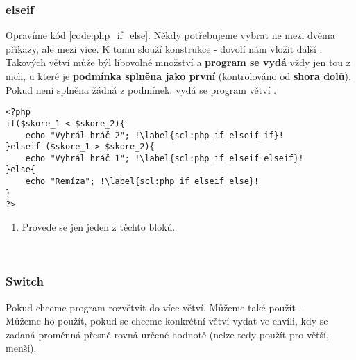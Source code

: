 \subsubsection{elseif}
Opravíme kód \ref{code:php_if_else}. Někdy potřebujeme vybrat ne mezi dvěma příkazy, ale mezi více. K tomu slouží konstrukce  - dovolí nám vložit další . Takových větví může býl libovolné množství a \textbf{program se vydá} vždy jen tou z nich, u které je \textbf{podmínka splněna jako první} (kontrolováno od \textbf{shora dolů}). Pokud není splněna žádná z podmínek, vydá se program větví .
\begin{minipage}[t]{.45\textwidth}
\begin{code}
\begin{verbatim}
<?php
if($skore_1 < $skore_2){
	echo "Vyhrál hráč 2"; !\label{scl:php_if_elseif_if}!
}elseif ($skore_1 > $skore_2){
	echo "Vyhrál hráč 1"; !\label{scl:php_if_elseif_elseif}!
}else{
	echo "Remíza"; !\label{scl:php_if_elseif_else}!
}
?>
\end{verbatim}

\label{code:php_if_else}
\end{code}
\end{minipage}
\begin{minipage}[t]{.45\textwidth}
\begin{enumerate}
\item[ř. \ref{scl:php_if_elseif_if}, \ref{scl:php_if_elseif_elseif}, \ref{scl:php_if_elseif_else}:] Provede se jen jeden z těchto bloků.
\end{enumerate}
\end{minipage}\\

\subsubsection{Switch}
Pokud chceme program rozvětvit do více větví. Můžeme také použít .\\
Můžeme ho použít, pokud se chceme konkrétní větví vydat ve chvíli, kdy se zadaná proměnná přesně rovná určené hodnotě (nelze tedy použít pro větší, menší).\\

